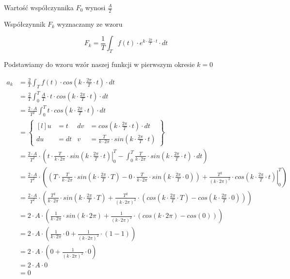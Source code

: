 Wartość współczynnika $F_0$ wynosi $\frac{A}{2}$

Współczynnik $F_k$ wyznaczamy ze wzoru

\begin{equation}
F_k=\frac{1}{T}\int_{T}f(t) \cdot e^{ k \cdot \frac{2\pi}{T} \cdot t} \cdot dt
\end{equation}

Podstawiamy do wzoru wzór naszej funkcji w pierwszym okresie $k=0$

\begin{equation}
\begin{aligned}
a_k&=\frac{2}{T}\int_{T}f(t) \cdot cos\left( k \cdot \frac{2\pi}{T} \cdot t\right) \cdot dt\\
&=\frac{2}{T}\int_{0}^{T} \frac{A}{T} \cdot t \cdot cos\left( k \cdot \frac{2\pi}{T} \cdot t\right) \cdot dt\\
&=\frac{2\cdot A}{T^2}\int_{0}^{T} t \cdot cos\left( k \cdot \frac{2\pi}{T} \cdot t\right) \cdot dt\\
&=\begin{Bmatrix*}[l]
u&=t & dv&=cos\left( k \cdot \frac{2\pi}{T} \cdot t\right) \cdot dt \\
du&=dt & v&=\frac{T}{k\cdot 2\pi}\cdot sin\left( k \cdot \frac{2\pi}{T} \cdot t\right)
\end{Bmatrix*}\\
&=\frac{2\cdot A}{T^2}\cdot \left( \left. t \cdot \frac{T}{k\cdot 2\pi}\cdot sin\left( k \cdot \frac{2\pi}{T} \cdot t\right) \right|_{0}^{T} - \int_{0}^{T}  \frac{T}{k\cdot 2\pi}\cdot sin\left( k \cdot \frac{2\pi}{T} \cdot t\right) \cdot dt \right)\\
&=\frac{2\cdot A}{T^2}\cdot \left( \left( T \cdot \frac{T}{k\cdot 2\pi}\cdot sin\left( k \cdot \frac{2\pi}{T} \cdot T\right) - 0 \cdot \frac{T}{k\cdot 2\pi}\cdot sin\left( k \cdot \frac{2\pi}{T} \cdot 0\right) \right) + \left.  \frac{T^2}{\left(k\cdot 2\pi\right)^2}\cdot cos\left( k \cdot \frac{2\pi}{T} \cdot t\right) \right|_{0}^{T} \right)\\
&=\frac{2\cdot A}{T^2}\cdot \left(\frac{T^2}{k\cdot 2\pi}\cdot sin\left( k \cdot \frac{2\pi}{T} \cdot T\right) + \frac{T^2}{\left(k\cdot 2\pi\right)^2}\cdot \left( cos\left( k \cdot \frac{2\pi}{T} \cdot T\right) - cos\left( k \cdot \frac{2\pi}{T} \cdot 0\right) \right) \right)\\
&=2\cdot A\cdot \left(\frac{1}{k\cdot 2\pi}\cdot sin\left( k \cdot 2\pi\right) + \frac{1}{\left(k\cdot 2\pi\right)^2}\cdot \left( cos\left( k \cdot 2\pi\right) - cos\left( 0\right) \right) \right)\\
&=2\cdot A\cdot \left(\frac{1}{k\cdot 2\pi}\cdot 0 + \frac{1}{\left(k\cdot 2\pi\right)^2}\cdot \left( 1 - 1 \right) \right)\\
&=2\cdot A\cdot \left(0 + \frac{1}{\left(k\cdot 2\pi\right)^2}\cdot 0 \right)\\
&=2\cdot A\cdot 0\\
&=0
\end{aligned}
\end{equation}

